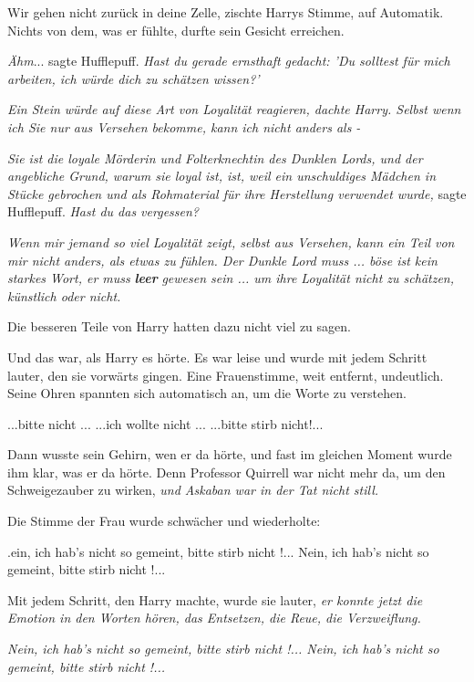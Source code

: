 \glqq{}Wir gehen nicht zurück in deine Zelle\grqq{}, zischte Harrys Stimme, auf
Automatik. Nichts von dem, was er fühlte, durfte sein Gesicht erreichen.

\emph{Ähm}... sagte Hufflepuff. \emph{Hast du gerade ernsthaft gedacht: 'Du
solltest für mich arbeiten, ich würde dich zu schätzen wissen?'}

\emph{Ein Stein würde auf diese Art von Loyalität reagieren, dachte Harry.
Selbst wenn ich Sie nur aus Versehen bekomme, kann ich nicht anders als -}

\emph{Sie ist die loyale Mörderin und Folterknechtin des Dunklen Lords, und der
angebliche Grund, warum sie loyal ist, ist, weil ein unschuldiges Mädchen in
Stücke gebrochen und als Rohmaterial für ihre Herstellung verwendet wurde,
}sagte Hufflepuff. \emph{Hast du das vergessen?}

\emph{Wenn mir jemand so viel Loyalität zeigt, selbst aus Versehen, kann ein
Teil von mir nicht anders, als etwas zu fühlen. Der Dunkle Lord muss ... böse ist
kein starkes Wort, er muss} \textbf{\emph{leer}}\emph{ gewesen sein ... um ihre
Loyalität nicht zu schätzen, künstlich oder nicht.}

Die besseren Teile von Harry hatten dazu nicht viel zu sagen.

Und das war, als Harry es hörte. Es war leise und wurde mit jedem Schritt
lauter, den sie vorwärts gingen. Eine Frauenstimme, weit entfernt, undeutlich.
Seine Ohren spannten sich automatisch an, um die Worte zu verstehen.

\glqq{}...bitte nicht ...\grqq{} \glqq{}...ich wollte nicht ...\grqq{} \glqq{}
...bitte stirb nicht!...\grqq{}

Dann wusste sein Gehirn, wen er da hörte, und fast im gleichen Moment wurde ihm
klar, was er da hörte. Denn Professor Quirrell war nicht mehr da, um den
Schweigezauber zu wirken, \emph{und Askaban war in der Tat nicht still.}

Die Stimme der Frau wurde schwächer und wiederholte:

\grqq{}.ein, ich hab's nicht so
gemeint, bitte stirb nicht !...\grqq{} \glqq{}Nein, ich hab's nicht so gemeint,
bitte stirb nicht !...\grqq{}

Mit jedem Schritt, den Harry machte, wurde sie lauter, \emph{er konnte jetzt die
Emotion in den Worten hören, das Entsetzen, die Reue, die Verzweiflung.}

\emph{\glqq{}Nein, ich hab's nicht so
gemeint, bitte stirb nicht !...\grqq{} \glqq{}Nein, ich hab's nicht so gemeint,
bitte stirb nicht !...\grqq{}}

